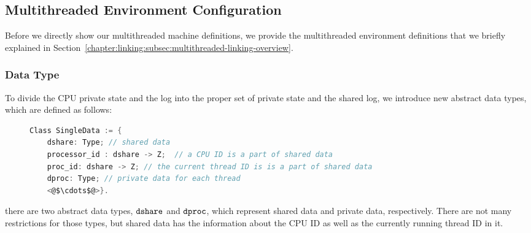
\subsection{Multithreaded Environment Configuration}
\label{chapter:linking:subsec:multithreaded-env-configuration}

Before we directly show our multithreaded machine definitions, 
we provide the multithreaded environment definitions that we briefly explained in Section~\ref{chapter:linking:subsec:multithreaded-linking-overview}.
%

\subsubsection{Data Type} 
%
To divide the CPU private state and the log into the proper set of private state and the shared log, we introduce 
new abstract data types, which are defined as follows:
\begin{figure}
\begin{lstlisting}[language=C, morekeywords={Class}]
Class SingleData := {
    dshare: Type; // shared data    
    processor_id : dshare -> Z;  // a CPU ID is a part of shared data
    proc_id: dshare -> Z; // the current thread ID is is a part of shared data
    dproc: Type; // private data for each thread
    <@$\cdots$@>}.
\end{lstlisting} 
\end{figure}
there are two abstract data types, ${\mathrm{\texttt{dshare}}}$ and ${\mathrm{\texttt{dproc}}}$, 
which represent shared data and private data, respectively. 
There are not many restrictions for those types,
but shared data has the information about the CPU ID as well as the currently running thread ID in it.


